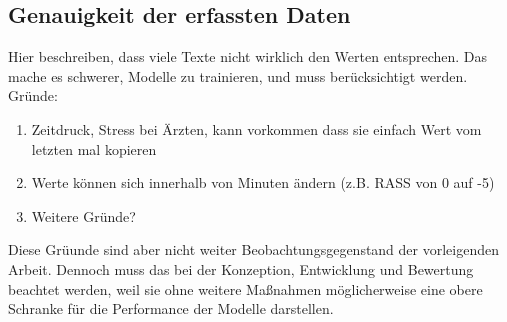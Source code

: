 
\subsection{Genauigkeit der erfassten Daten}
Hier beschreiben, dass viele Texte nicht wirklich den Werten entsprechen. Das mache es schwerer, Modelle zu trainieren, und muss berücksichtigt werden. Gründe:
\begin{enumerate}
    \item Zeitdruck, Stress bei Ärzten, kann vorkommen dass sie einfach Wert vom letzten mal kopieren
    \item Werte können sich innerhalb von Minuten ändern (z.B. RASS von 0 auf -5)
    \item Weitere Gründe?
\end{enumerate}
Diese Grüunde sind aber nicht weiter Beobachtungsgegenstand der vorleigenden Arbeit. Dennoch muss das bei der Konzeption, Entwicklung und Bewertung beachtet werden, weil sie ohne weitere Maßnahmen möglicherweise eine obere Schranke für die Performance der Modelle darstellen.

